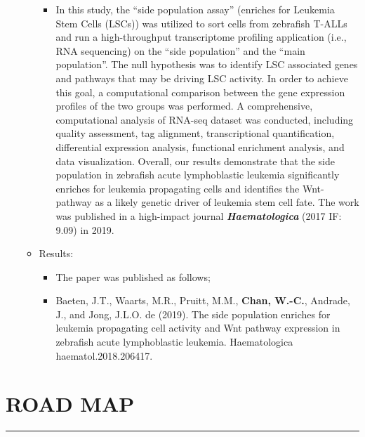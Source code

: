 \documentclass[]{article}
\providecommand{\tightlist}{%
  \setlength{\itemsep}{0pt}\setlength{\parskip}{0pt}}
\begin{document}
\begin{itemize}
\begin{itemize}
    \begin{itemize}
    \tightlist
    \item
      In this study, the ``side population assay'' (enriches for
      Leukemia Stem Cells (LSCs)) was utilized to sort cells from
      zebrafish T-ALLs and run a high-throughput transcriptome profiling
      application (i.e., RNA sequencing) on the ``side population'' and
      the ``main population''. The null hypothesis was to identify LSC
      associated genes and pathways that may be driving LSC activity. In
      order to achieve this goal, a computational comparison between the
      gene expression profiles of the two groups was performed. A
      comprehensive, computational analysis of RNA-seq dataset was
      conducted, including quality assessment, tag alignment,
      transcriptional quantification, differential expression analysis,
      functional enrichment analysis, and data visualization. Overall,
      our results demonstrate that the side population in zebrafish
      acute lymphoblastic leukemia significantly enriches for leukemia
      propagating cells and identifies the Wnt-pathway as a likely
      genetic driver of leukemia stem cell fate. The work was published
      in a high-impact journal \textbf{\emph{Haematologica}} (2017 IF:
      9.09) in 2019.
    \end{itemize}
  \item
    Results:

    \begin{itemize}
    \tightlist
    \item
      The paper was published as follows;
    \item
      Baeten, J.T., Waarts, M.R., Pruitt, M.M., \textbf{Chan, W.-C.},
      Andrade, J., and Jong, J.L.O. de (2019). The side population
      enriches for leukemia propagating cell activity and Wnt pathway
      expression in zebrafish acute lymphoblastic leukemia.
      Haematologica haematol.2018.206417.
    \end{itemize}
  \end{itemize}
\end{itemize}

\section{ROAD MAP}\label{road-map}

\begin{center}\rule{0.5\linewidth}{\linethickness}\end{center}
\end{document}
